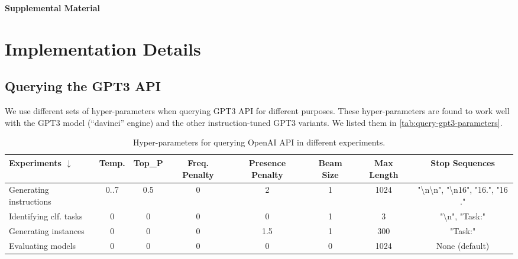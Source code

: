 \documentclass[11pt]{article}
\newcommand{\gptthree}{\textsc{GPT3}}
\begin{document}



\appendix
\onecolumn
\begin{center}
{\Large \textbf{Supplemental Material}}
\end{center}
\section{Implementation Details}
\label{sec:implementaion}

\subsection{Querying the GPT3 API}
\label{subsec:query_gpt3_api}

We use different sets of hyper-parameters when querying GPT3 API for different purposes. These hyper-parameters are found to work well with the GPT3 model (``davinci'' engine) and the other instruction-tuned \gptthree{} variants. We listed them in \autoref{tab:query-gpt3-parameters}.

\begin{table}[h]
    \centering
    \small
\begin{tabular}{|l|c|c|c|c|c|c|c|}
\toprule
  Experiments $\downarrow$                               & Temp. & Top\_P & Freq. Penalty & Presence Penalty & Beam Size & Max Length & Stop Sequences                                                             \\ \midrule
Generating instructions          & 0..7        & 0.5    & 0                 & 2                & 1         & 1024                  & "\textbackslash{}n\textbackslash{}n", "\textbackslash{}n16", "16.", "16 ." \\
Identifying clf. tasks & 0           & 0      & 0                 & 0                & 1         & 3                     & "\textbackslash{}n", "Task:"                                               \\
Generating instances             & 0           & 0      & 0                 & 1.5              & 1         & 300                   & "Task:"                                                                    \\
Evaluating models    & 0           & 0      & 0                 & 0                & 0         & 1024                  & None (default) \\
\bottomrule
\end{tabular}
    \caption{Hyper-parameters for querying OpenAI API in different experiments.}
    \label{tab:query-gpt3-parameters}
\end{table}
\end{document}
